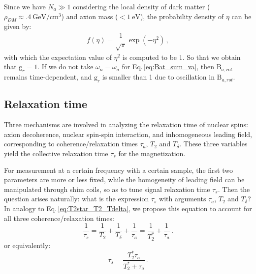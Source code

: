 Since we have $N_a \gg 1$ considering the local density of dark matter ($\rho_{DM}\approx\SI{.4}{\GeV/\cm^{3}}$) and axion mass ($<\SI{1}{\electronvolt}$), the probability density of $\eta$ can be given by:
\begin{align}
    f(\eta) = \dfrac{1}{\sqrt{\pi}} \exp\left( - \eta^2 \right)\,,
\end{align}
with which the expectation value of $ \eta^2 $ is computed to be $1$. So that we obtain that $\mathrm{g}_r = 1$. If we do not take $\omega_n = \omega_a$ for Eq.\,\eqref{eq:Bat_sum_va}, then $\mathrm{B}_{a, rot}$ remains time-dependent, and $\mathrm{g}_{r}$ is smaller than 1 due to oscillation in $\mathrm{B}_{a, rot}$. 




\subsection{Relaxation time}

Three mechanisms are involved in analyzing the relaxation time of nuclear spins: axion decoherence, nuclear spin-spin interaction, and inhomogeneous leading field, corresponding to coherence/relaxation times $\tau_a$, $T_2$ and $T_\delta$. These three variables yield the collective relaxation time $\tau_s$ for the magnetization. 

For measurement at a certain frequency with a certain sample, the first two parameters are more or less fixed, while the homogeneity of leading field can be manipulated through shim coils, so as to tune signal relaxation time $\tau_s$. Then the question arises naturally: what is the expression $\tau_s$ with arguments $\tau_a$, $T_2$ and $T_\delta$? In analogy to Eq.\,\eqref{eq:T2star_T2_Tdelta}, we propose this equation to account for all three coherence/relaxation times:
\begin{equation}
    \dfrac{1}{\tau_s} = \dfrac{1}{T_2} + \dfrac{1}{T_{\delta}}+ \dfrac{1}{\tau_a}
    = \dfrac{1}{T_2^*} + \dfrac{1}{\tau_a}
    \,.\label{eq:taus_T2_Tdelta_taua_rate}
\end{equation}
or equivalently:
\begin{equation}
    \tau_s = \dfrac{T_2^* \tau_a}{T_2^* + \tau_a}\,.\label{eq:taus_T2_Tdelta_taua}
\end{equation}

